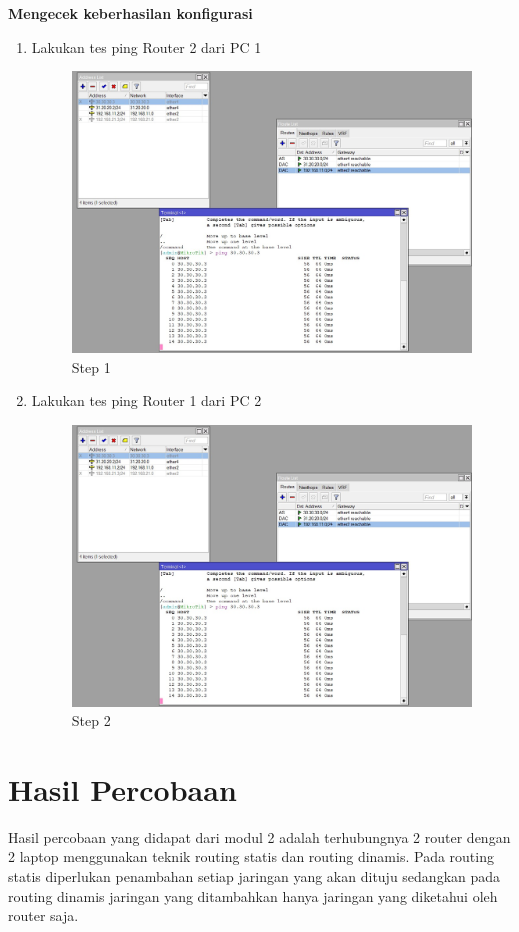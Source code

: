 \begin{center} 
	\textbf{Mengecek keberhasilan konfigurasi}
\end{center}

\begin{enumerate}
	\item Lakukan tes ping Router 2 dari PC 1
	\begin{figure}[H]
		\centering
		\includegraphics[width=0.5\linewidth]{P2/img/statis_ping.jpg}
		\caption{Step 1}
		\label{fig:gambar14}
	\end{figure}

	\item Lakukan tes ping Router 1 dari PC 2
	\begin{figure}[H]
		\centering
		\includegraphics[width=0.5\linewidth]{P2/img/statis_ping.jpg}
		\caption{Step 2}
		\label{fig:gambar15}
	\end{figure}

\end{enumerate}

\section{Hasil Percobaan}
Hasil percobaan yang didapat dari modul 2 adalah terhubungnya 2 router dengan 2 laptop menggunakan teknik routing statis dan routing dinamis. Pada routing statis diperlukan penambahan setiap jaringan yang akan dituju sedangkan pada routing dinamis jaringan yang ditambahkan hanya jaringan yang diketahui oleh router saja.

